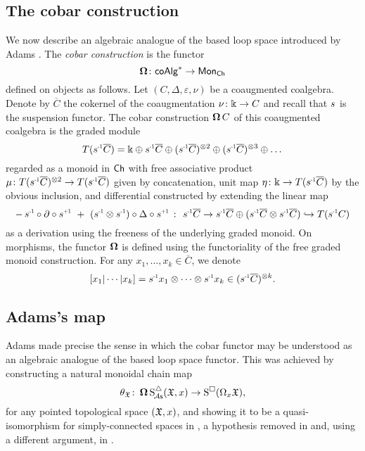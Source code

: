 \subsection{The cobar construction}\label{ss:cobar construction}

We now describe an algebraic analogue of the based loop space introduced by Adams \cite{adams1956cobar}.
The \textit{cobar construction} is the functor
\[
\operatorname{\mathbf{\Omega}} \colon \mathsf{coAlg}^\ast \to \mathsf{Mon}_{\mathsf{Ch}}
\]
defined on objects as follows.
Let $(C, \Delta, \varepsilon, \nu)$ be a coaugmented coalgebra.
Denote by $\overline{C}$ the cokernel of the coaugmentation $\nu \colon \Bbbk \to C$ and recall that $\s{}$ is the suspension functor.
The cobar construction $\operatorname{\mathbf{\Omega}} C$ of this coaugmented coalgebra is the graded module
\[
T(\s{-1} \overline{C}) =
\k \oplus \s{-1}\overline{C} \oplus (\s{-1}\overline{C})^{\ot 2} \oplus (\s{-1}\overline{C})^{\ot 3} \oplus \dots
\]
regarded as a monoid in $\mathsf{Ch}$ with free associative product $\mu \colon T(\s{-1} \overline{C})^{\ot 2} \to T(\s{-1} \overline{C})$ given by concatenation, unit map $\eta \colon \k \to T(\s{-1} \overline{C})$ by the obvious inclusion, and differential constructed by extending the linear map
\[
-\, \s{-1} \circ \partial \circ \s{+1} \ + \ (\s{-1} \ot \s{-1}) \circ \Delta \circ \s{+1} \ \colon \
\s{-1} \overline{C} \to \s{-1}\overline{C} \oplus (\s{-1}\overline{C} \ot \s{-1}\overline{C}) \hookrightarrow T(\s{-1}C)
\]
as a derivation using the freeness of the underlying graded monoid.
On morphisms, the functor $\operatorname{\mathbf{\Omega}}$ is defined using the functoriality of the free graded monoid construction.
For any $x_1, \dots, x_k \in \overline{C}$, we denote
\[
[x_1| \cdots | x_k]= \s{-1} x_1 \otimes \cdots \otimes \s{-1}x_k \in (\s{-1}\overline{C})^{\otimes k}.
\]

\subsection{Adams's map}\label{ss:adams maps}

Adams made precise the sense in which the cobar functor may be understood as an algebraic analogue of the based loop space functor. This was achieved by constructing a natural monoidal chain map
\begin{equation}\label{e:adams map 2}
	\theta_{\mathfrak{X}} \colon \operatorname{\mathbf{\Omega}} \operatorname{S^{\triangle}_{\!{\mathcal{A}\mathsf{s}}}}(\mathfrak{X},x) \to \operatorname{S^{\square}}(\Omega_x \mathfrak{X}),
\end{equation}
for any pointed topological space $(\mathfrak{X},x)$, and showing it to be a quasi-isomorphism for simply-connected spaces in \cite{adams1956cobar}, a hypothesis removed in \cite{rivera2018cubical} and, using a different argument, in \cite{rivera2019path}.

